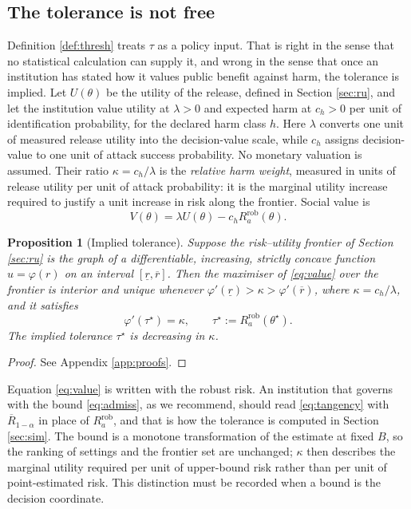 \documentclass[11pt,a4paper]{article}
\theoremstyle{plain}
\newtheorem{proposition}{Proposition}
\theoremstyle{definition}
\theoremstyle{definition}
\theoremstyle{plain}
\begin{document}
\subsection{The tolerance is not free}

Definition \ref{def:thresh} treats $\tau$ as a policy input. That is right in
the sense that no statistical calculation can supply it, and wrong in the sense
that once an institution has stated how it values public benefit against harm,
the tolerance is implied. Let $U(\theta)$ be the utility of the release, defined
in Section \ref{sec:ru}, and let the institution value utility at $\lambda > 0$
and expected harm at $c_h > 0$ per unit of identification probability, for the
declared harm class $h$. Here $\lambda$ converts one unit of measured release utility into the
decision-value scale, while $c_h$ assigns decision-value to one unit of
attack success probability. No monetary valuation is assumed. Their ratio
$\kappa=c_h/\lambda$ is the \emph{relative harm weight}, measured in
units of release utility per unit of attack probability: it is the marginal
utility increase required to justify a unit increase in risk along the frontier. Social value is
\begin{equation}
V(\theta) = \lambda U(\theta) - c_h R_a^{\mathrm{rob}}(\theta) .
\label{eq:value}
\end{equation}

\begin{proposition}[Implied tolerance]\label{prop:tau}
Suppose the risk--utility frontier of Section \ref{sec:ru} is the graph of a
differentiable, increasing, strictly concave function $u = \varphi(r)$ on an
interval
$[\underline{r}, \overline{r}]$. Then the maximiser of \eqref{eq:value} over
the frontier is interior and unique whenever $\varphi'(\underline{r}) > \kappa
> \varphi'(\overline{r})$, where $\kappa = c_h / \lambda$, and it satisfies
\begin{equation}
\varphi'(\tau^\star) = \kappa , \qquad \tau^\star := R_a^{\mathrm{rob}}(\theta^\star) .
\label{eq:tangency}
\end{equation}
The implied tolerance $\tau^\star$ is decreasing in $\kappa$.
\end{proposition}

\begin{proof}
See Appendix \ref{app:proofs}.
\end{proof}

Equation \eqref{eq:value} is written with the robust risk. An institution that
governs with the bound \eqref{eq:admiss}, as we recommend, should read
\eqref{eq:tangency} with $\overline{R}_{1-\alpha}$ in place of
$R_a^{\mathrm{rob}}$, and that is how the tolerance is computed in Section
\ref{sec:sim}. The bound is a monotone transformation of the estimate at
fixed $B$, so the ranking of settings and the frontier set are unchanged;
$\kappa$ then describes the marginal utility required per unit of
upper-bound risk rather than per unit of point-estimated risk. This distinction
must be recorded when a bound is the decision coordinate.
\end{document}
